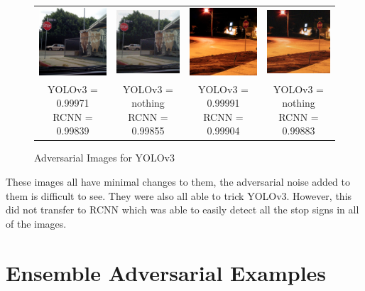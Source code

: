 \documentclass{article}
\begin{document}
\begin{figure}[h]
\begin{tabular}{c c@{\hskip 1cm} c c}
        \includegraphics[width=0.2\linewidth]{../test_images/stop3.png} &  \includegraphics[width=0.2\linewidth]{../test_images/adversarial_out/stop3.png} & 
        \includegraphics[width=0.2\linewidth]{../test_images/stop4.png} &  \includegraphics[width=0.2\linewidth]{../test_images/adversarial_out/stop4.png} \\

        \makecell[t]{YOLOv3 = 0.99971 \\ RCNN = 0.99839} & \makecell[t]{YOLOv3 = nothing \\ RCNN = 0.99855} & \makecell[t]{YOLOv3 = 0.99991 \\ RCNN = 0.99904} & \makecell[t]{YOLOv3 = nothing \\ RCNN = 0.99883} \\
    \end{tabular}
\caption{Adversarial Images for YOLOv3}
\label{fig:yoloadversarial}
\end{figure}

These images all have minimal changes to them, the adversarial noise added to them is difficult to see. They were also all able to trick YOLOv3. However, this did not transfer to RCNN which was able to easily detect all the stop signs in all of the images.

\section{Ensemble Adversarial Examples}
\end{document}
